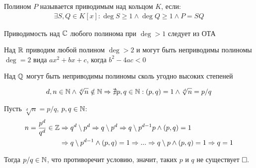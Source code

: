\documentclass{article}
\begin{document}


Полином $P$ называется приводимым над кольцом $K$, если:
\begin{align*}
	\exists S,Q\in K[x]:\deg S\geq 1\land \deg Q\geq 1\land P=SQ
\end{align*}

Приводимость над $\Cx$ любого полинома при $\deg>1$ следует из ОТА

Над $\R$ приводим любой полином $\deg>2$ и могут быть неприводимы полиномы $\deg=2$ вида $ax^2 + bx +c$, когда $b^2 - 4ac < 0$

Над $\Q$ могут быть неприводимы полиномы сколь угодно высоких степеней

\theorem
\begin{align*}
	d, n\in\N\land\sqrt[d]{n}\notin \N \Rarr \nexists p, q\in \N:(p,q) = 1\land \sqrt[d]{n} = p/q
\end{align*}

\proof

Пусть $\sqrt[d]{n} = p/q$, $p,q\in\N$:
\begin{align*}
	n=\frac{p^{d}}{q^{d}}\in\Z & \Rarr q^{d}\setminus p^{d}\Rarr q\setminus p^{d} \Rarr q\setminus p^{d-1}p\land (p,q)=1 \\
	                           & \Rarr q\setminus p^{d-1}\land(p,q)=1\Rarr...\Rarr q\setminus p\land(p,q)=1\Rarr q=1
\end{align*}

Тогда $p/q\in\N$, что противоречит условию, значит, таких $p$ и $q$ не существует$\qed$
\end{document}
